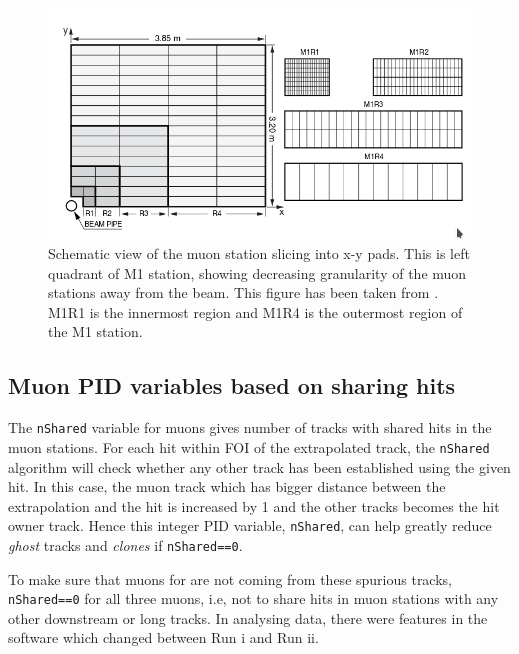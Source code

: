 \begin{figure}[!h]
        \centering
        \includegraphics[width = 1.0\textwidth]{figs/trimuon/pad.png}
        \caption{Schematic view of the muon station slicing into x-y pads. This is left quadrant of M1 station, showing decreasing granularity of the muon stations away from the beam. This figure has been taken from \cite{LHCb-DP-2012-002}. M1R1 is the innermost region and M1R4 is the outermost region of the M1 station. }
        \label{fig:pads}
\end{figure}

\subsection{Muon PID variables based on sharing hits }
\label{bugs}

The \texttt{nShared} variable for muons gives number of tracks with shared hits in the muon stations. For each hit within \gls{FOI} of the extrapolated track, the \texttt{nShared} algorithm will check whether any other track has been established using the given hit. In this case, the muon track which has bigger distance between the extrapolation and the hit is increased by 1 and the other tracks becomes the hit owner track. Hence this integer \gls{PID} variable, \texttt{nShared}, can help greatly reduce \textit{ghost} tracks and \textit{clones} if \texttt{nShared==0}.

To make sure that muons for \Bmumumu are not coming from these spurious tracks,  \texttt{nShared==0} for all three muons, i.e, not to share hits in muon stations with any other downstream or long tracks. In analysing data, there were features in the software which changed between Run \Rn{1} and Run \Rn{2}.

